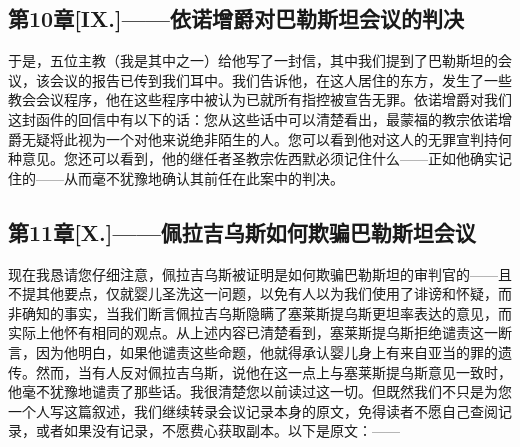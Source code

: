 
\subsection{第10章[IX.]——依诺增爵对巴勒斯坦会议的判决}

于是，五位主教（我是其中之一）给他写了一封信，其中我们提到了巴勒斯坦的会议，该会议的报告已传到我们耳中。我们告诉他，在这人居住的东方，发生了一些教会会议程序，他在这些程序中被认为已就所有指控被宣告无罪。依诺增爵对我们这封函件的回信中有以下的话：您从这些话中可以清楚看出，最蒙福的教宗依诺增爵无疑将此视为一个对他来说绝非陌生的人。您可以看到他对这人的无罪宣判持何种意见。您还可以看到，他的继任者圣教宗佐西默必须记住什么——正如他确实记住的——从而毫不犹豫地确认其前任在此案中的判决。\par


\subsection{第11章[X.]——佩拉吉乌斯如何欺骗巴勒斯坦会议}

现在我恳请您仔细注意，佩拉吉乌斯被证明是如何欺骗巴勒斯坦的审判官的——且不提其他要点，仅就婴儿圣洗这一问题，以免有人以为我们使用了诽谤和怀疑，而非确知的事实，当我们断言佩拉吉乌斯隐瞒了塞莱斯提乌斯更坦率表达的意见，而实际上他怀有相同的观点。从上述内容已清楚看到，塞莱斯提乌斯拒绝谴责这一断言，因为他明白，如果他谴责这些命题，他就得承认婴儿身上有来自亚当的罪的遗传。然而，当有人反对佩拉吉乌斯，说他在这一点上与塞莱斯提乌斯意见一致时，他毫不犹豫地谴责了那些话。我很清楚您以前读过这一切。但既然我们不只是为您一个人写这篇叙述，我们继续转录会议记录本身的原文，免得读者不愿自己查阅记录，或者如果没有记录，不愿费心获取副本。以下是原文：——\par

